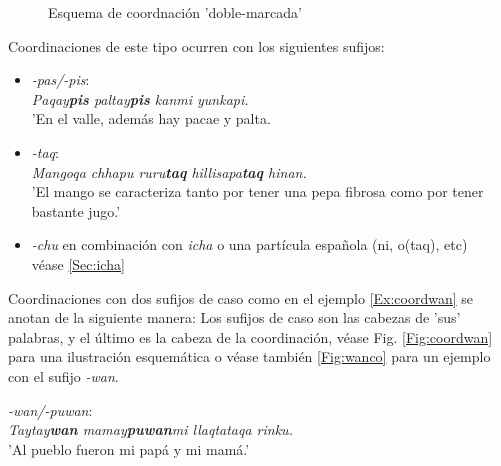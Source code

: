 \documentclass[a4paper,11pt,DIV12]{scrartcl}
\begin{document}
\begin{figure}
\begin{center}
\caption{Esquema de coordnaci\'on 'doble-marcada'}\label{Fig:Coord}
\end{center}
\end{figure}

Coordinaciones de este tipo ocurren con los siguientes sufijos:

\begin{itemize}
 \item {\em -pas/-pis}:\\
      {\em Paqay\textbf{pis} paltay\textbf{pis} kanmi yunkapi.}\\
      'En el valle, adem\'as hay pacae y palta.
 \item {\em -taq}:\\
      {\em Mangoqa chhapu ruru\textbf{taq} hillisapa\textbf{taq} hinan.}\\
      'El mango se caracteriza tanto por tener una pepa fibrosa como por tener bastante jugo.'\\
	\hfill{\small \citep[141-143]{Cusi2}}
 \item {\em -chu} en combinaci\'on con {\em icha} o una part\'icula espa\~nola (ni, o(taq), etc)\\
       v\'ease \ref{Sec:icha}
\end{itemize}

Coordinaciones con dos sufijos de caso como en el ejemplo \ref{Ex:coordwan} se anotan de la siguiente manera:
Los sufijos de caso son las cabezas de 'sus' palabras, y el \'ultimo es la cabeza de la coordinaci\'on, v\'ease Fig. \ref{Fig:coordwan} para una ilustraci\'on esquem\'atica o v\'ease tambi\'en \ref{Fig:wanco} para un ejemplo con el sufijo {\em -wan}.

\begin{examples}
 \item\label{Ex:coordwan} {\em -wan/-puwan}:\\
      {\em Taytay\textbf{wan} mamay\textbf{puwan}mi llaqtataqa rinku.}\\
      'Al pueblo fueron mi pap\'a y mi mam\'a.'
	\hfill{\small \citep[141-143]{Cusi2}}
\end{examples}
\end{document}
